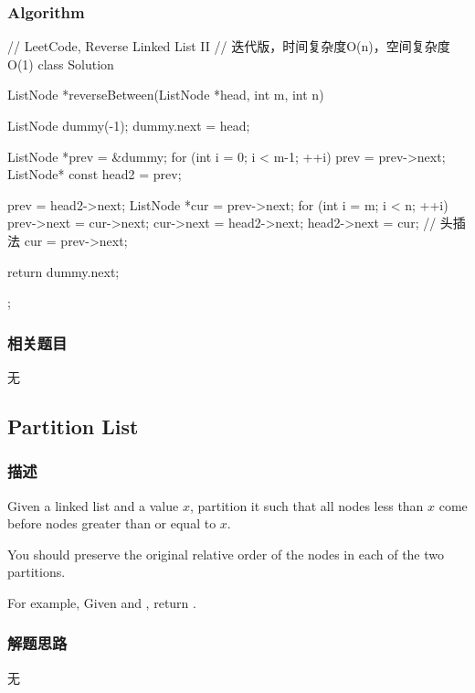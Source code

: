 \subsubsection{Algorithm}
\begin{Code}
	// LeetCode, Reverse Linked List II
	// 迭代版，时间复杂度O(n)，空间复杂度O(1)
	class Solution {
		ListNode *reverseBetween(ListNode *head, int m, int n) {
			ListNode dummy(-1);
			dummy.next = head;
			
			ListNode *prev = &dummy;
			for (int i = 0; i < m-1; ++i)
				prev = prev->next;
			ListNode* const head2 = prev;
			
			prev = head2->next;
			ListNode *cur = prev->next;
			for (int i = m; i < n; ++i) {
				prev->next = cur->next;
				cur->next = head2->next;
				head2->next = cur;  // 头插法
				cur = prev->next;
			}
			
			return dummy.next;
		}
	};
\end{Code}


\subsubsection{相关题目}

\begindot
\item 无
\myenddot


\subsection{Partition List}
\label{sec:partition-list}


\subsubsection{描述}
Given a linked list and a value $x$, partition it such that all nodes less than 
$x$ come before nodes greater than or equal to $x$.

You should preserve the original relative order of the nodes in each of the two 
partitions.

For example,
Given  and , return .


\subsubsection{解题思路}
无


